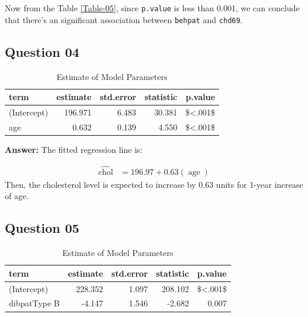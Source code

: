 \documentclass[
  12pt,
  oneside]{article}
\begin{document}
Now from the Table \ref{Table-05}, since \texttt{p.value} is less than 0.001, we can conclude that there's an significant association between \texttt{behpat} and \texttt{chd69}.

\clearpage

\hypertarget{question-04}{%
\subsection{Question 04}\label{question-04}}

\begin{table}[H]

\caption{\label{tab:Table-06}Estimate of Model Parameters}
\centering
\begin{tabular}[t]{lrrrr}
\toprule
term & estimate & std.error & statistic & p.value\\
\midrule
(Intercept) & 196.971 & 6.483 & 30.381 & \$<.001\$\\
age & 0.632 & 0.139 & 4.550 & \$<.001\$\\
\bottomrule
\end{tabular}
\end{table}

\textbf{Answer:} The fitted regression line is:

\begin{equation}
\begin{aligned}
\operatorname{\widehat{chol}} &= 196.97 + 0.63(\operatorname{age})
\end{aligned}
\end{equation}
Then, the cholesterol level is expected to increase by 0.63 units
for 1-year increase of age.

\hypertarget{question-05}{%
\subsection{Question 05}\label{question-05}}

\begin{table}[H]

\caption{\label{tab:Table-07}Estimate of Model Parameters}
\centering
\begin{tabular}[t]{lrrrr}
\toprule
term & estimate & std.error & statistic & p.value\\
\midrule
(Intercept) & 228.352 & 1.097 & 208.102 & \$<.001\$\\
dibpatType B & -4.147 & 1.546 & -2.682 & 0.007\\
\bottomrule
\end{tabular}
\end{table}
\end{document}
